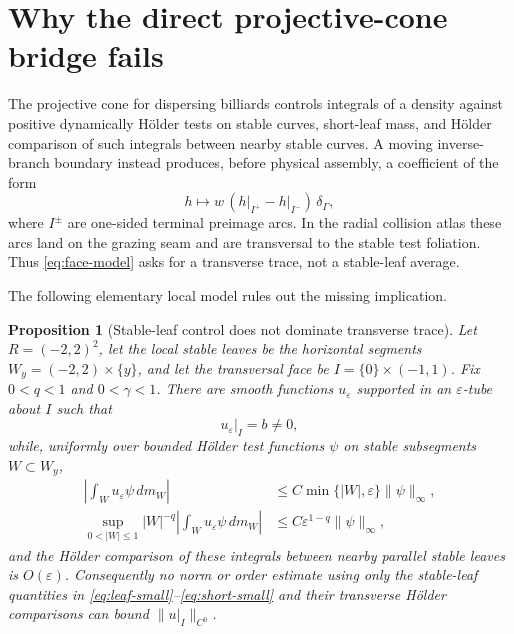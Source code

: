 \documentclass[11pt]{article}
\newtheorem{proposition}[theorem]{Proposition}
\begin{document}
\section{Why the direct projective-cone bridge fails}

The projective cone for dispersing billiards controls integrals of a density
against positive dynamically H\"older tests on stable curves, short-leaf
mass, and H\"older comparison of such integrals between nearby stable curves.
A moving inverse-branch boundary instead produces, before physical assembly,
a coefficient of the form
\begin{equation}
\label{eq:face-model}
  h\longmapsto w\,(h\vert_{I^+}-h\vert_{I^-})\,\delta_\Gamma,
\end{equation}
where $I^\pm$ are one-sided terminal preimage arcs.  In the radial collision
atlas these arcs land on the grazing seam and are transversal to the stable
test foliation.  Thus \eqref{eq:face-model} asks for a transverse trace, not a
stable-leaf average.

The following elementary local model rules out the missing implication.

\begin{proposition}[Stable-leaf control does not dominate transverse trace]
\label{prop:no-trace}
Let $R=(-2,2)^2$, let the local stable leaves be the horizontal segments
$W_y=(-2,2)\times\{y\}$, and let the transversal face be
$I=\{0\}\times(-1,1)$.  Fix $0<q<1$ and $0<\gamma<1$.  There are smooth
functions $u_\varepsilon$ supported in an $\varepsilon$-tube about $I$ such
that
\[
 u_\varepsilon\vert_I=b\ne0,
\]
while, uniformly over bounded H\"older test functions $\psi$ on stable
subsegments $W\subset W_y$,
\begin{align}
 \left|\int_Wu_\varepsilon\psi\,dm_W\right|
 &\le C\min\{|W|,\varepsilon\}\|\psi\|_\infty,
       \label{eq:leaf-small}\\
 \sup_{0<|W|\le1}|W|^{-q}
 \left|\int_Wu_\varepsilon\psi\,dm_W\right|
 &\le C\varepsilon^{1-q}\|\psi\|_\infty,\label{eq:short-small}
\end{align}
and the H\"older comparison of these integrals between nearby parallel
stable leaves is $O(\varepsilon)$.  Consequently no norm or order estimate
using only the stable-leaf quantities in
\eqref{eq:leaf-small}--\eqref{eq:short-small} and their transverse H\"older
comparisons can bound $\|u\vert_I\|_{C^0}$.
\end{proposition}
\end{document}
